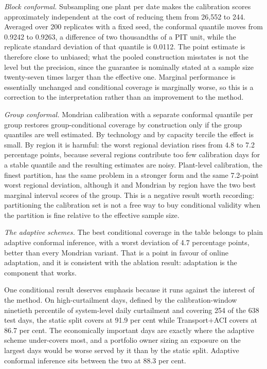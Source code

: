 \documentclass[preprint,3p,times]{elsarticle}
\begin{document}


\emph{Block conformal.} Subsampling one plant per date makes the calibration scores approximately independent at the cost of reducing them from 26{,}552 to 244. Averaged over 200 replicates with a fixed seed, the conformal quantile moves from 0.9242 to 0.9263, a difference of two thousandths of a PIT unit, while the replicate standard deviation of that quantile is 0.0112. The point estimate is therefore close to unbiased; what the pooled construction misstates is not the level but the precision, since the guarantee is nominally stated at a sample size twenty-seven times larger than the effective one. Marginal performance is essentially unchanged and conditional coverage is marginally worse, so this is a correction to the interpretation rather than an improvement to the method.

\emph{Group conformal.} Mondrian calibration with a separate conformal quantile per group restores group-conditional coverage by construction only if the group quantiles are well estimated. By technology and by capacity tercile the effect is small. By region it is harmful: the worst regional deviation rises from 4.8 to 7.2 percentage points, because several regions contribute too few calibration days for a stable quantile and the resulting estimates are noisy. Plant-level calibration, the finest partition, has the same problem in a stronger form and the same 7.2-point worst regional deviation, although it and Mondrian by region have the two best marginal interval scores of the group. This is a negative result worth recording: partitioning the calibration set is not a free way to buy conditional validity when the partition is fine relative to the effective sample size.

\emph{The adaptive schemes.} The best conditional coverage in the table belongs to plain adaptive conformal inference, with a worst deviation of 4.7 percentage points, better than every Mondrian variant. That is a point in favour of online adaptation, and it is consistent with the ablation result: adaptation is the component that works.

One conditional result deserves emphasis because it runs against the interest of the method. On high-curtailment days, defined by the calibration-window ninetieth percentile of system-level daily curtailment and covering 254 of the 638 test days, the static split covers at 91.9 per cent while Transport+ACI covers at 86.7 per cent. The economically important days are exactly where the adaptive scheme under-covers most, and a portfolio owner sizing an exposure on the largest days would be worse served by it than by the static split. Adaptive conformal inference sits between the two at 88.3 per cent.
\end{document}
